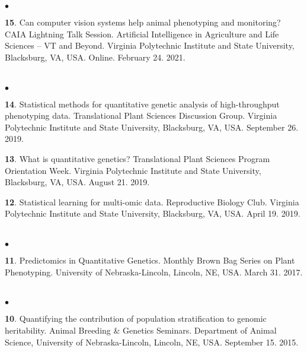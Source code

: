 \documentclass[margin,line,10pt]{res}
\newenvironment{list2}{
  \begin{list}{$\bullet$}{%
      \setlength{\itemsep}{0in}
      \setlength{\parsep}{0in} \setlength{\parskip}{0in}
      \setlength{\topsep}{0in} \setlength{\partopsep}{0in} 
      \setlength{\leftmargin}{0.2in}}}{\end{list}}
\begin{document}
\begin{resume}
\begin{list2}
  \vspace{0.5cm}


  \item [{\bf 15}.] Can computer vision systems help animal phenotyping and monitoring? CAIA Lightning Talk Session. Artificial Intelligence in Agriculture and Life Sciences – VT and Beyond. Virginia Polytechnic Institute and State University, Blacksburg, VA, USA. Online. February 24. 2021.
\end{list2}





\section{}
\begin{list2}
\item [{\bf 14}.] Statistical methods for quantitative genetic analysis of high-throughput phenotyping data. Translational Plant Sciences Discussion Group. Virginia Polytechnic Institute and State University, Blacksburg, VA, USA. September 26. 2019.

  \vspace{0.5cm}

\item [{\bf 13}.] What is quantitative genetics? Translational Plant Sciences Program Orientation Week. Virginia Polytechnic Institute and State University, Blacksburg, VA, USA. August 21. 2019.
  
  \vspace{0.5cm}

\item [{\bf 12}.] Statistical learning for multi-omic data. Reproductive Biology Club. Virginia Polytechnic Institute and State University, Blacksburg, VA, USA. April 19. 2019.
\end{list2}  

\section{}
\begin{list2}
\item [{\bf 11}.] Predictomics in Quantitative Genetics. Monthly Brown Bag Series on Plant Phenotyping. University of Nebraska-Lincoln, Lincoln, NE, USA. March 31. 2017.
\end{list2}  

\section{}
\begin{list2}
\item  [{\bf 10}.] Quantifying the contribution of population stratification to genomic heritability. Animal Breeding \& Genetics Seminars. Department of Animal Science, University of Nebraska-Lincoln, Lincoln, NE, USA. September 15. 2015. 
\end{list2}  


\end{resume}
\end{document}
